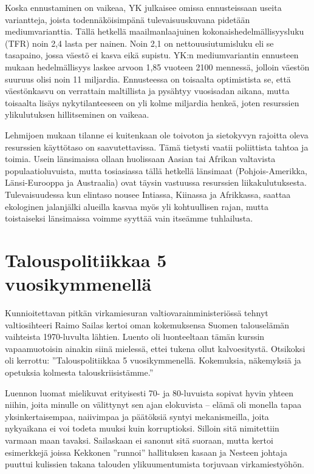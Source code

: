 \documentclass[12pt]{article}
\begin{document}
Koska ennustaminen on vaikeaa, YK julkaisee omissa ennusteissaan useita variantteja, joista todennäköisimpänä tulevaisuuskuvana pidetään mediumvarianttia. Tällä hetkellä maailmanlaajuinen kokonaishedelmällisyysluku (TFR) noin 2,4 lasta per nainen. Noin 2,1 on nettouusiutumisluku eli se tasapaino, jossa väestö ei kasva eikä supistu. YK:n mediumvariantin ennusteen mukaan hedelmällisyys laskee arvoon 1,85 vuoteen 2100 mennessä, jolloin väestön suuruus olisi noin 11 miljardia. Ennusteessa on toisaalta optimistista se, että väestönkasvu on verrattain maltillista ja pysähtyy vuosisadan aikana, mutta toisaalta lisäys nykytilanteeseen on yli kolme miljardia henkeä, joten resurssien ylikulutuksen hillitseminen on vaikeaa.

Lehmijoen mukaan tilanne ei kuitenkaan ole toivoton ja sietokyvyn rajoitta oleva resurssien käyttötaso on saavutettavissa. Tämä tietysti vaatii poliittista tahtoa ja toimia. Usein länsimaissa ollaan huolissaan Aasian tai Afrikan valtavista populaatioluvuista, mutta tosiasiassa tällä hetkellä länsimaat (Pohjois-Amerikka, Länsi-Eurooppa ja Austraalia) ovat täysin vastuussa resurssien liikakulutuksesta. Tulevaisuudessa kun elintaso nousee Intiassa, Kiinassa ja Afrikkassa, saattaa ekologinen jalanjälki alueilla kasvaa myös yli kohtuullisen rajan, mutta toistaiseksi länsimaissa voimme syyttää vain itseämme tuhlailusta.


\newpage
\section{Talouspolitiikkaa 5 vuosikymmenellä}

Kunnioitettavan pitkän virkamiesuran valtiovarainministeriössä tehnyt valtiosihteeri Raimo Sailas kertoi oman kokemuksensa Suomen talouselämän vaihteista 1970-luvulta lähtien. Luento oli luonteeltaan tämän kurssin vapaamuotoisin ainakin siinä mielessä, ettei tukena ollut kalvoesitystä. Otsikoksi oli kerrottu: ''Talouspolitiikkaa 5 vuosikymmenellä. Kokemuksia, näkemyksiä ja opetuksia kolmesta talouskriisistämme.''

Luennon luomat mielikuvat erityisesti 70- ja 80-luvuista sopivat hyvin yhteen niihin, joita minulle on välittynyt sen ajan elokuvista -- elämä oli monella tapaa yksinkertaisempaa, naiivimpaa ja päätöksiä syntyi mekanismeilla, joita nykyaikana ei voi todeta muuksi kuin korruptioksi. Silloin sitä nimitettiin varmaan maan tavaksi. Sailaskaan ei sanonut sitä suoraan, mutta kertoi esimerkkejä joissa Kekkonen ''runnoi'' hallituksen kasaan ja Nesteen johtaja puuttui kulissien takana talouden ylikuumentumista torjuvaan virkamiestyöhön.
\end{document}
